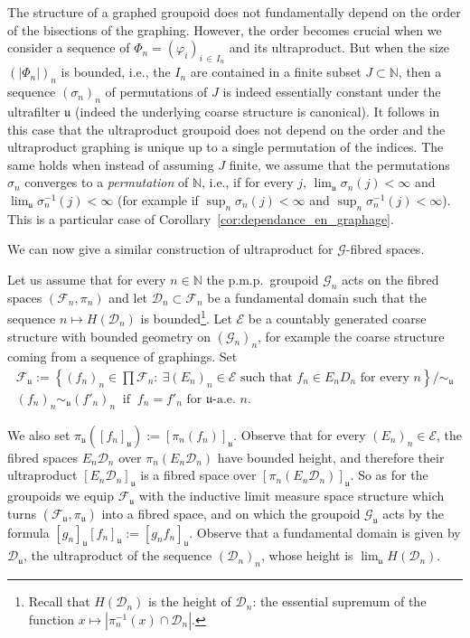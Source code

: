 \documentclass[AHL,Unicode,longabstracts,published]{cedram}
\newcommand{\Nmath}{\mathbb{N}}
\newcommand{\coarse}{\mathcal{E}}
\newcommand{\cg}{\mathcal{G}}
\newcommand{\cf}{\mathcal{F}}
\newcommand{\cd}{\mathcal{D}}
\newcommand{\ul}{\mathfrak{u}}
\newcommand{\ulae}{\mathfrak{u}\textrm{-a.e. }n}
\newcommand{\ph}{\varphi}
\newcommand{\pmp}{p.m.p.\ }
\let\oldexists\exists
\renewcommand*{\exists}{\mathrel{\oldexists}}
\begin{document}
\begin{rema}\label{rem: order of the graphings and ultra-prod}
The structure of a graphed groupoid does not fundamentally depend on the order of the bisections of the graphing. However, the order becomes crucial when we consider a sequence of $\Phi_n=(\ph_i)_{i\,\in\,I_n}$ and its ultraproduct. But when the size $(|\Phi_n|)_n$ is bounded, i.e., the $I_n$ are contained in a finite subset $J\subset \Nmath$, then a sequence $(\sigma_n)_n$ of permutations of $J$ is indeed essentially constant under the ultrafilter $\ul$ (indeed the underlying coarse structure is canonical). It follows in this case that the ultraproduct groupoid does not depend on the order and the ultraproduct graphing is unique up to a single permutation of the indices. The same holds when instead of assuming $J$ finite, we assume that the permutations $\sigma_n$ converges to a \emph{permutation} of $\Nmath$, i.e., if for every $j$, $\lim_\ul \sigma_n(j)<\infty$ and $\lim_\ul \sigma_n^{-1}(j)<\infty$ (for example if $\sup_n \sigma_n(j)<\infty$ and $\sup_n \sigma_n^{-1}(j)<\infty$). This is a particular case of Corollary~\ref{cor:dependance_en_graphage}.
\end{rema}

We can now give a similar construction of ultraproduct for $\cg$-fibred spaces.

\begin{defi}\label{def:ultraaction}
Let us assume that for every $n\in\Nmath$ the \pmp groupoid $\cg_n$ acts on the fibred spaces $(\cf_n,\pi_n)$ and let $\cd_n\subset\cf_n$ be a fundamental domain such that the sequence $n\mapsto H(\cd_n)$ is bounded\footnote{Recall that $H(\cd_n)$ is the height of $\cd_n$: the essential supremum of the function $x\mapsto |\pi_n^{-1}(x)\cap \cd_n|$.}. Let $\coarse$ be a countably generated coarse structure with bounded geometry on $(\cg_n)_n$, for example the coarse structure coming from a sequence of graphings. Set
\begin{gather*}
\cf_\ul:=\left\lbrace (f_n)_n\in \prod\cf_n:\ \exists (E_n)_n \in \coarse \text{ such that }f_n \in E_n D_n\text{ for every }n\right\rbrace/\sim_\ul\\
(f_n)_n\sim_\ul (f'_n)_n\ \text{ if }\ f_{n}= f'_{n}\text{ for }\ulae.
\end{gather*}

We also set $\pi_\ul([f_n]_\ul):=[\pi_n(f_n)]_\ul$. Observe that for every $(E_n)_n \in \coarse$, the fibred spaces $E_n \cd_n$ over $\pi_n(E_n \cd_n)$ have bounded height, and therefore their ultraproduct $[E_n \cd_n]_\ul$ is a fibred space over $[\pi_n(E_n \cd_n)]_\ul$. So as for the groupoids we equip $\cf_\ul$ with the inductive limit measure space structure which turns $(\cf_\ul,\pi_\ul)$ into a fibred space, and on which the groupoid $\cg_\ul$ acts by the formula $[g_n]_\ul[f_n]_\ul:=[g_n f_n]_\ul$. Observe that a fundamental domain is given by $\cd_\ul$, the ultraproduct of the sequence $(\cd_n)_n$, whose height is $\lim_\ul H(\cd_n)$.
\end{defi}
\end{document}
